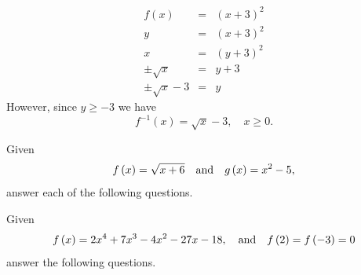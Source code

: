 \documentclass[12pt,addpoints, answers, fleqn]{exam}
\begin{document}
\begin{questions}
\begin{solution}
\begin{eqnarray*}
f \left( x \right) &=& \left( x + 3 \right)^2\\
y &=& \left( x + 3 \right)^2\\
x &=& \left( y + 3 \right)^2\\
\pm \sqrt{x} &=& y + 3\\
\pm \sqrt{x} -3 &=& y
\end{eqnarray*}
However, since $y \geq -3$ we have
\[
\boxed{f^{-1} \left( x \right) = \sqrt{x} -3, \quad x \geq 0}.
\]
\end{solution}
\question Given
\[
f \left( x \right) =\sqrt{x+6} \quad {\rm{and}} \quad g \left( x \right) =x^2 - 5,
\]
answer each of the following questions.
\question Given
\[
f \left( x \right) = 2x^4 + 7x^3 - 4x^2 - 27x - 18, \quad {\rm{and}} \quad f \left( 2 \right) = f \left( -3 \right) = 0
\]
answer the following questions.
\begin{parts}

\end{parts}
\end{questions}
\end{document}
